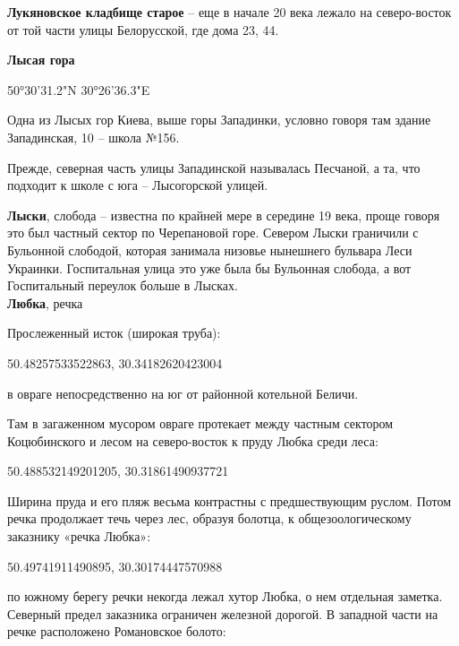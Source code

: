 \medskip

\textbf{Лукяновское кладбище старое} – еще в начале 20 века лежало на северо-восток от той части улицы Белорусской, где дома 23, 44.\\

\medskip

\textbf{Лысая гора}

50°30'31.2"N 30°26'36.3"E

Одна из Лысых гор Киева, выше горы Западинки, условно говоря там здание Западинская, 10 – школа  №156.

Прежде, северная часть улицы Западинской называлась Песчаной, а та, что подходит к школе с юга – Лысогорской улицей.\\

\medskip


\textbf{Лыски}, слобода – известна по крайней мере в середине 19 века, проще говоря это был частный сектор по Черепановой горе. Севером Лыски граничили с Бульонной слободой, которая занимала низовье нынешнего бульвара Леси Украинки. Госпитальная улица это уже была бы Бульонная слобода, а вот Госпитальный переулок больше в Лысках.\\





\textbf{Любка}, речка

Прослеженный исток (широкая труба):

50.48257533522863, 30.34182620423004

в овраге непосредственно на юг от районной котельной Беличи.

Там в загаженном мусором овраге протекает между частным сектором Коцюбинского и лесом 
на северо-восток к пруду Любка среди леса:

50.488532149201205, 30.31861490937721

Ширина пруда и его пляж весьма контрастны с предшествующим руслом. Потом речка продолжает течь через лес, образуя болотца, к общезоологическому заказнику «речка Любка»:

50.49741911490895, 30.30174447570988

по южному берегу речки некогда лежал хутор Любка, о нем отдельная заметка. Северный предел заказника ограничен железной дорогой. В западной части на речке расположено Романовское болото:

